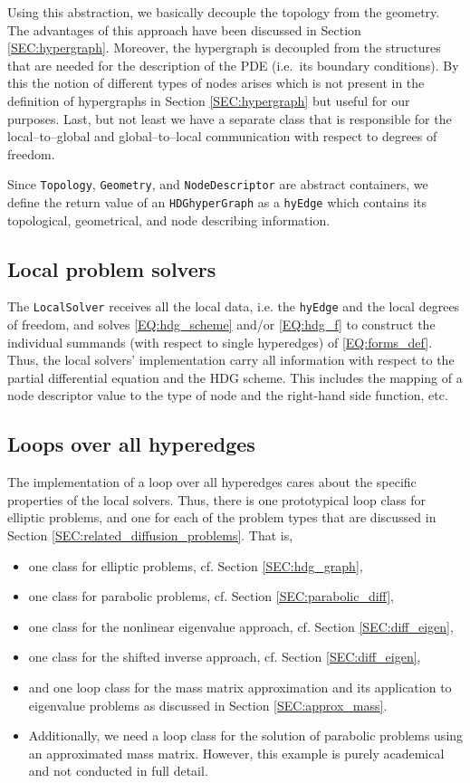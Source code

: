 \documentclass[a4paper, english, 12pt, reqno, draft]{amsart}
\theoremstyle{definition}
\theoremstyle{remark}
\numberwithin{equation}{section}
\newcommand{\code}[1]{\texttt{#1}}
\begin{document}
% 
Using this abstraction, we basically decouple the topology from the geometry. The advantages of this approach have been discussed in Section \ref{SEC:hypergraph}. Moreover, the hypergraph is decoupled from the structures that are needed for the description of the PDE (i.e.\ its boundary conditions). By this the notion of different types of nodes arises which is not present in the definition of hypergraphs in Section \ref{SEC:hypergraph} but useful for our purposes. Last, but not least we have a separate class that is responsible for the local--to--global and global--to--local communication with respect to degrees of freedom.

Since \code{Topology}, \code{Geometry}, and \code{NodeDescriptor} are abstract containers, we define the return value of an \code{HDGhyperGraph} as a \code{hyEdge} which contains its topological, geometrical, and node describing information.
% 
\subsection{Local problem solvers}
% 
The \code{LocalSolver} receives all the local data, i.e. the \code{hyEdge} and the local degrees of freedom, and solves \eqref{EQ:hdg_scheme} and/or \eqref{EQ:hdg_f} to construct the individual summands (with respect to single hyperedges) of \eqref{EQ:forms_def}. Thus, the local solvers' implementation carry all information with respect to the partial differential equation and the HDG scheme. This includes the mapping of a node descriptor value to the type of node and the right-hand side function, etc.
% 
\subsection{Loops over all hyperedges}
% 
The implementation of a loop over all hyperedges cares about the specific properties of the local solvers. Thus, there is one prototypical loop class for elliptic problems, and one for each of the problem types that are discussed in Section \ref{SEC:related_diffusion_problems}. That is,
% 
\begin{itemize}
 \item one class for elliptic problems, cf. Section \ref{SEC:hdg_graph},
 \item one class for parabolic problems, cf. Section \ref{SEC:parabolic_diff},
 \item one class for the nonlinear eigenvalue approach, cf. Section \ref{SEC:diff_eigen},
 \item one class for the shifted inverse approach, cf. Section \ref{SEC:diff_eigen},
 \item and one loop class for the mass matrix approximation and its application to eigenvalue problems as discussed in Section \ref{SEC:approx_mass}.
 \item Additionally, we need a loop class for the solution of parabolic problems using an approximated mass matrix. However, this example is purely academical and not conducted in full detail.
\end{itemize}
\end{document}
